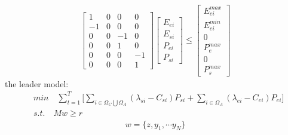 \documentclass[11pt]{article} %
\begin{document}
\begin{align} 
    \begin{bmatrix}
        1 & 0 & 0 & 0\\
        -1 & 0 & 0 & 0\\
        0 & 0 & -1 & 0\\
        0 & 0 & 1 & 0\\
        0 & 0 & 0 & -1\\
        0 & 0 & 0 & 1
    \end{bmatrix} 
    \begin{bmatrix}
        E_{ei}\\
        E_{si}\\
        P_{ei}\\
        P_{si}
    \end{bmatrix} \leq
    \begin{bmatrix}
        E_{ei}^{max}\\
        E_{ei}^{min}\\
        0\\
        P_{e}^{max}\\
        0\\
        P_{s}^{max}
    \end{bmatrix}
\end{align}
the leader model:
\begin{align}  
    &min \quad \sum_{t = 1}^{T} \Bigg[ \sum_{i \in \Omega_C\bigcup \Omega_A } (\lambda _{si} - C_{si}) P_{si} + 
    \sum_{i \in \Omega_A } (\lambda _{ei} - C_{ei}) P_{ei} \Bigg] \nonumber\\
    &s.t. \quad Mw \geq r
\end{align}
\begin{align}  
    w = \{z, y_{1}, \cdots y_{N}\}
\end{align}
\end{document}
